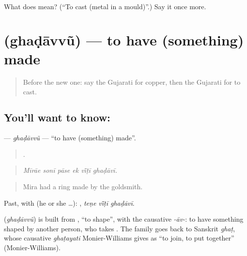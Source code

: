 \begin{tcolorbox}[breakable,colback=teal!4,colframe=teal!35!black,title={Before you move on}]
What does  mean? (\textquotedblleft{}To cast (metal in a mould)\textquotedblright{}.) Say it once more.
\end{tcolorbox}
\section[\texorpdfstring{\gu{ઘડાવવું} (ghaḍāvvũ)}{ઘડાવવું (ghaḍāvvũ)}]{ (ghaḍāvvũ) — to have (something) made}

\label{lesson:GU-C510-ghadavvu}



\begin{quote}
Before the new one: say the Gujarati for copper, then the Gujarati for to cast.
\end{quote}

\subsection*{You'll want to know: }
\textbf{} — \emph{ghaḍāvvũ} — \textquotedblleft{}to have (something) made\textquotedblright{}.

\begin{quote}
     .
\end{quote}

\begin{quote}
\emph{Mīrāe sonī pāse ek vī̃ṭī ghaḍāvī.}
\end{quote}

\begin{quote}
Mira had a ring made by the goldsmith.
\end{quote}

Past, with  (he or she …):   , \emph{teṇe vī̃ṭī ghaḍāvī}.

\begin{cousinweb}
\textbf{} (\emph{ghaḍāvvũ}) is built from \textbf{}, \textquotedblleft{}to shape\textquotedblright{}, with the causative \emph{-āv-}: to have something shaped by another person, who takes \textbf{}. The family goes back to Sanskrit \emph{ghaṭ}, whose causative \emph{ghaṭayati} Monier-Williams gives as \textquotedblleft{}to join, to put together\textquotedblright{} (Monier-Williams).
\end{cousinweb}

